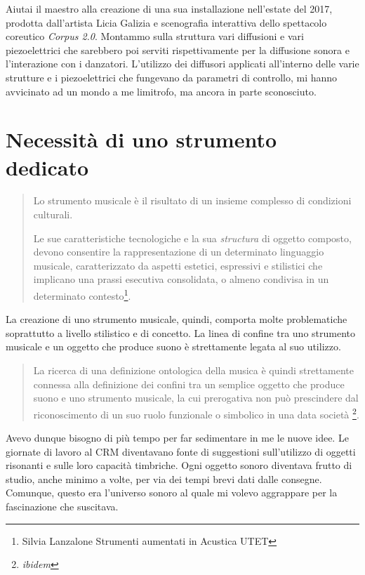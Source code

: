 Aiutai il maestro alla creazione di una sua installazione nell'estate del 2017, prodotta dall'artista Licia Galizia e scenografia interattiva dello spettacolo coreutico \textit{Corpus 2.0}. Montammo sulla struttura vari diffusioni e vari piezoelettrici che sarebbero poi serviti rispettivamente per la diffusione sonora e l'interazione con i danzatori. L'utilizzo dei diffusori applicati all'interno delle varie strutture e i piezoelettrici che fungevano da parametri di controllo, mi hanno avvicinato ad un mondo a me limitrofo, ma ancora in parte sconosciuto. \\

\section{Necessità di uno strumento dedicato}

\begin{small}
\begin{quotation}
Lo strumento musicale è il risultato di un insieme complesso di condizioni culturali.

Le sue caratteristiche tecnologiche e la sua \textit{structura} di oggetto composto, devono consentire la rappresentazione di un determinato linguaggio musicale, caratterizzato da aspetti estetici, espressivi e stilistici che implicano una prassi esecutiva consolidata, o almeno condivisa in un determinato contesto\footnote{Silvia Lanzalone Strumenti aumentati in Acustica UTET}.
\end{quotation}
\end{small}
La creazione di uno strumento musicale, quindi, comporta molte problematiche soprattutto a livello stilistico e di concetto. La linea di confine tra uno strumento musicale e un oggetto che produce suono è strettamente legata al suo utilizzo.
\begin{small}
\begin{quotation}
La ricerca di una definizione ontologica della musica è quindi strettamente connessa alla definizione dei confini tra un semplice oggetto che produce suono e uno strumento musicale, la cui prerogativa non può prescindere dal riconoscimento di un suo ruolo funzionale o simbolico in una data società
\footnote{\textit{ibidem}}.
\end{quotation}
\end{small}

Avevo dunque bisogno di più tempo per far sedimentare in me le nuove idee. Le giornate di lavoro al CRM diventavano fonte di suggestioni sull'utilizzo di oggetti risonanti e sulle loro capacità timbriche. Ogni oggetto sonoro diventava frutto di studio, anche minimo a volte, per via dei tempi brevi dati dalle consegne. Comunque, questo era l'universo sonoro al quale mi volevo aggrappare per la fascinazione che suscitava.

